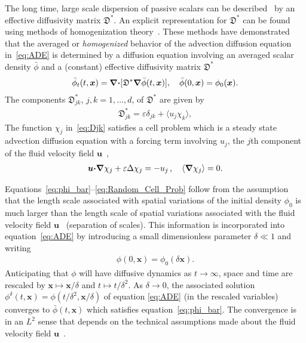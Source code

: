 \documentclass[english,12pt,jmp,graphicx]{revtex4-1}
\newcommand{\vecu}{\boldsymbol{u}}
\newcommand{\vecx}{\boldsymbol{x}}
\newcommand{\bnabla}{\mbox{\boldmath${\nabla}$}}
\newcommand{\bcdot}{\mbox{\boldmath${\cdot}$}}
\newcommand{\Dg}{\mathfrak{D}}
\begin{document}
The long time, large scale dispersion of passive scalars can be
described~\cite{Taylor:PRSL:196} by an effective diffusivity
matrix $\Dg^*$. An explicit representation for $\Dg^*$ can be found
using methods of homogenization
theory~\cite{Bensoussan:Book:1978,Papanicolaou:RF-835}. These methods
have demonstrated that the averaged or \emph{homogenized} behavior of
the advection diffusion equation in~\eqref{eq:ADE} is determined by a
diffusion equation involving an averaged scalar density $\bar{\phi}$ and
a (constant) effective diffusivity matrix 
$\Dg^*$~\cite{McLaughlin:SIAM_JAM:780}   
%
\begin{align}\label{eq:phi_bar}
  \bar{\phi}_t(t,\vecx)=\bnabla\bcdot[\Dg^*\bnabla \bar{\phi}(t,\vecx)], \quad
  \bar{\phi}(0,\vecx)=\phi_0(\vecx).
\end{align}
%
The components $\Dg^*_{jk}$, $j,k=1,\ldots,d$, of $\Dg^*$ are given
by~\cite{McLaughlin:SIAM_JAM:780}   
%
\begin{align}\label{eq:Djk}
  \Dg^*_{jk}=\varepsilon\delta_{jk}+\langle u_j\chi_k\rangle,
\end{align}
%
The
function $\chi_j$ in~\eqref{eq:Djk} satisfies a cell problem which is a
steady state advection diffusion equation with a forcing term
involving $u_j$, the $j$th component of the fluid velocity field
$\vecu$~\cite{McLaughlin:SIAM_JAM:780,Fannjiang:1997:1033},    
%
\begin{align}\label{eq:Random_Cell_Prob}
  \vecu\bcdot\bnabla\chi_j+\varepsilon\Delta\chi_j=-u_j\,,
  \quad
  \langle\bnabla \chi_j\rangle=0.
\end{align}
%
  




Equations~\eqref{eq:phi_bar}--\eqref{eq:Random_Cell_Prob}
follow from the assumption that the length scale associated with
spatial variations of the initial density $\phi_0$ is much larger than
the length scale of spatial variations associated with the fluid
velocity field
$\vecu$~\cite{McLaughlin:SIAM_JAM:780,Fannjiang:1997:1033} (separation
of scales). This  
information is incorporated into equation~\eqref{eq:ADE} by
introducing a small dimensionless parameter $\delta\ll1$ and
writing~\cite{McLaughlin:SIAM_JAM:780}    
%
\begin{align}
  \phi(0,\vecx)=\phi_0(\delta\vecx). 
\end{align}
%
Anticipating that $\phi$ will have diffusive dynamics as $t\to\infty$, space and 
time are rescaled by $\vecx\mapsto\vecx/\delta$ and $t\mapsto t/\delta^2$. As
$\delta\to0$, the associated solution $\phi^\delta(t,\vecx)=\phi(t/\delta^2,\vecx/\delta)$ of
equation \eqref{eq:ADE} (in the rescaled variables) converges to
$\bar{\phi}(t,\vecx)$ which satisfies equation~\eqref{eq:phi_bar}. The
convergence is in an $L^2$ sense that depends on the technical
assumptions made about the
fluid velocity field
$\vecu$~\cite{McLaughlin:SIAM_JAM:780,Avellaneda:CMP-339,Fannjiang:1994:SIAM_JAM:333,Fannjiang:1997:1033,Pavliotis:PHD_Thesis,Majda:Kramer:1999:book}.   
\end{document}
